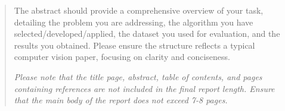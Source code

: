 \documentclass[11pt,a4paper]{article}
\begin{document}


\tableofcontents
\thispagestyle{empty}


\newpage
\begin{abstract}
The abstract should provide a comprehensive overview of your task, detailing the problem you are addressing, the algorithm you have selected/developed/applied, the dataset you used for evaluation, and the results you obtained. Please ensure the structure reflects a typical computer vision paper, focusing on clarity and conciseness.

\textit{Please note that the title page, abstract, table of contents, and pages containing references are not included in the final report length. Ensure that the main body of the report does not exceed 7-8 pages.}
\end{abstract}

\newpage


\setcounter{page}{1}







\newpage
\end{document}
